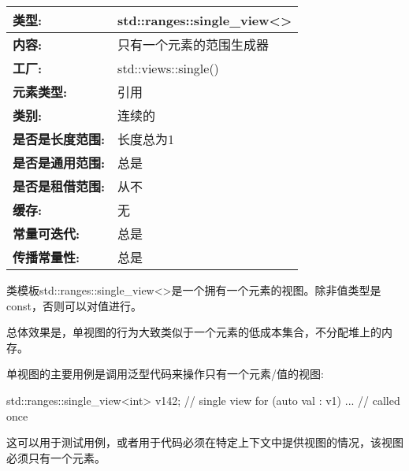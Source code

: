 \begin{longtable}[c]{|l|l|}
\hline
\textbf{类型:}                 & std::ranges::single\_view\textless{}\textgreater{} \\ \hline
\endfirsthead
%
\endhead
%
\textbf{内容:}              & 只有一个元素的范围生成器         \\ \hline
\textbf{工厂:}              & std::views::single()                               \\ \hline
\textbf{元素类型:}         & 引用                                          \\ \hline
\textbf{类别:}             & 连续的                                         \\ \hline
\textbf{是否是长度范围:}       & 长度总为1                                 \\ \hline
\textbf{是否是通用范围:}      & 总是                                             \\ \hline
\textbf{是否是租借范围:}    & 从不                                              \\ \hline
\textbf{缓存:}               & 无                                            \\ \hline
\textbf{常量可迭代:}       & 总是                                             \\ \hline
\textbf{传播常量性:} & 总是                                             \\ \hline
\end{longtable}

类模板std::ranges::single\_view<>是一个拥有一个元素的视图。除非值类型是const，否则可以对值进行。

总体效果是，单视图的行为大致类似于一个元素的低成本集合，不分配堆上的内存。

单视图的主要用例是调用泛型代码来操作只有一个元素/值的视图:

\begin{cpp}
std::ranges::single_view<int> v1{42}; // single view
for (auto val : v1) {
	... // called once
}
\end{cpp}

这可以用于测试用例，或者用于代码必须在特定上下文中提供视图的情况，该视图必须只有一个元素。


